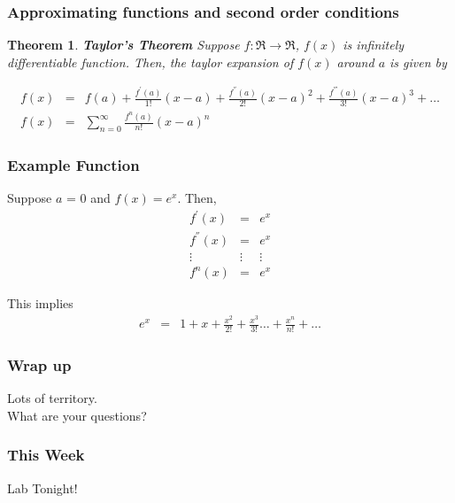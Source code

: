 \documentclass{beamer}
\newtheorem{thm}{Theorem}
\numberwithin{equation}{section}
\begin{document}
\begin{frame}
\frametitle{Approximating functions and second order conditions}


\begin{thm}
\textbf{Taylor's Theorem}
Suppose $f:\Re \rightarrow \Re$, $f(x)$ is infinitely differentiable function.  Then, the taylor expansion of $f(x)$ around \alert{$a$} is given by 

\begin{eqnarray}
f(x) & = & f(a) + \frac{f^{'}(a)}{1!} (x- a) + \frac{f^{''}(a)}{2!} (x - a)^2 + \frac{f^{'''}(a)}{3!}(x- a)^3 + \hdots \nonumber \\
f(x) & = & \sum_{n=0}^{\infty } \frac{f^{n} (a) }{n!} (x - a)^n \nonumber
\end{eqnarray}

\end{thm}




\end{frame}


\begin{frame}
\frametitle{Example Function}

Suppose $a$ = 0 and $f(x) = e^{x}$.  Then, 
\begin{eqnarray}
f^{'}(x) & = & e^{x} \nonumber \\
f^{''}(x) & = & e^{x} \nonumber \\
\vdots  & \vdots & \vdots \nonumber \\
f^{n} (x) & = & e^{x} \nonumber 
\end{eqnarray}

This implies
\begin{eqnarray}
e^{x} & = & 1 + x + \frac{x^{2}}{2!} + \frac{x^3}{3!} \hdots + \frac{x^{n}}{n!} + \hdots \nonumber \end{eqnarray}

\end{frame}





\begin{frame}
\frametitle{Wrap up}

Lots of territory. \\

What are your questions?  



\end{frame}



\begin{frame}
\frametitle{This Week}


{\huge \alert{Lab Tonight!}}


\end{frame}
\end{document}
